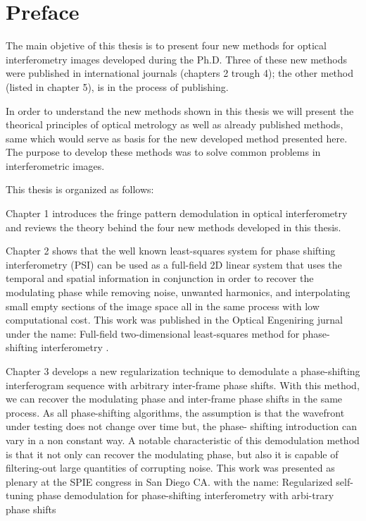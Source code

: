 \chapter*{Preface}

The main objetive of this thesis is to present four new methods for optical 
interferometry images developed during the Ph.D. Three of these new methods were 
published in international journals (chapters 2 trough 4); the other method 
(listed in chapter 5), is in the process of publishing.

In order to understand the new methods shown in this thesis we will present the
theorical principles of optical metrology as well as already published methods, 
same which would serve as basis for the new developed method presented here. 
The purpose to develop these methods was to solve common problems in 
interferometric images. 

This thesis is organized as follows:

Chapter 1 introduces the fringe pattern demodulation in optical 
interferometry and reviews the theory behind the four new methods developed in 
this thesis.

Chapter 2 shows that the well known least-squares system for phase shifting 
interferometry (PSI) can be used as a full-field 2D linear system that uses the 
temporal and spatial information in conjunction in order to recover the modulating 
phase while removing noise, unwanted harmonics, and interpolating small empty
sections of the image space all in the same process with low computational cost.
This work was published in the Optical Engeniring jurnal under the name: 
Full-field two-dimensional least-squares method for phase-shifting interferometry
\cite{Medina2014}.


Chapter 3 develops a new regularization technique to demodulate a 
phase-shifting interferogram sequence with arbitrary inter-frame phase shifts. 
With this method, we can recover the modulating phase and inter-frame phase
shifts in the same process. As all phase-shifting algorithms, the assumption
is that the wavefront under testing does not change over time but, the phase-
shifting introduction can vary in a non constant way. A notable characteristic
of this demodulation method is that it not only can recover the modulating
phase, but also it is capable of filtering-out large quantities of corrupting
noise. This work was presented as plenary at the SPIE congress in 
San Diego CA. with the name: Regularized self-tuning phase demodulation for 
phase-shifting interferometry with arbi-trary phase shifts \cite{Medina}


